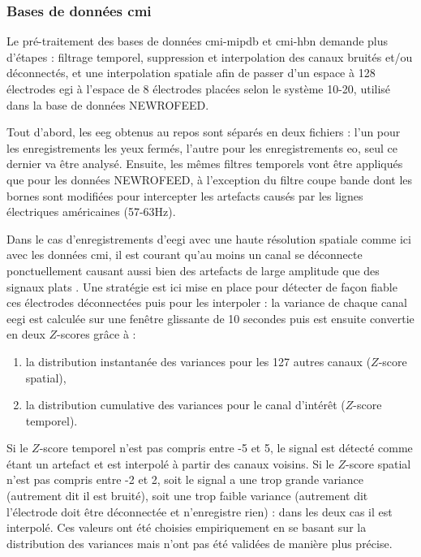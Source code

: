 \subsubsection{Bases de données \gls{cmi}} \label{treatment_cmi_databases}

Le pré-traitement des bases de données \gls{cmi-mipdb} et \gls{cmi-hbn} demande plus d'étapes : filtrage temporel, suppression et 
interpolation des canaux bruités et/ou déconnectés, et une interpolation spatiale afin de passer d'un espace à 128 électrodes \gls{egi}
à l'espace de 8 électrodes placées selon le système 10-20, utilisé dans la base de données NEWROFEED.

Tout d'abord, les \gls{eeg} obtenus au repos sont séparés en deux fichiers : l'un pour les enregistrements les yeux fermés, 
l'autre pour les enregistrements \gls{eo}, seul ce dernier va être analysé. Ensuite, les mêmes filtres temporels vont être appliqués
que pour les données NEWROFEED, à l'exception du filtre coupe bande dont les bornes sont modifiées pour intercepter les artefacts 
causés par les lignes électriques américaines (57-63Hz).

Dans le cas d'enregistrements d'\gls{eegi} avec une haute résolution spatiale comme ici avec les données \gls{cmi}, 
il est courant qu'au moins un canal se déconnecte ponctuellement causant aussi bien des artefacts de large amplitude que des signaux plats \citep{Barlow1986, Oregan2013}. 
Une stratégie est ici mise en place pour détecter de façon fiable ces électrodes déconnectées puis pour les interpoler : la variance de chaque canal 
\gls{eegi} est calculée sur une fenêtre glissante de 10 secondes puis est ensuite convertie en deux $Z$-scores grâce à :
\begin{enumerate}
\item la distribution instantanée des variances pour les 127 autres canaux ($Z$-score spatial),
\item la distribution cumulative des variances pour le canal d'intérêt ($Z$-score temporel).
\end{enumerate}
Si le $Z$-score temporel n'est pas compris entre -5 et 5, le signal est détecté comme étant un artefact et est interpolé à partir des canaux voisins.
Si le $Z$-score spatial n'est pas compris entre -2 et 2, soit le signal a une trop grande variance (autrement dit il est bruité), soit une trop faible
variance (autrement dit l'électrode doit être déconnectée et n'enregistre rien) : dans les deux cas il est interpolé. Ces valeurs ont été choisies
empiriquement en se basant sur la distribution des variances mais n'ont pas été validées de manière plus précise.  


